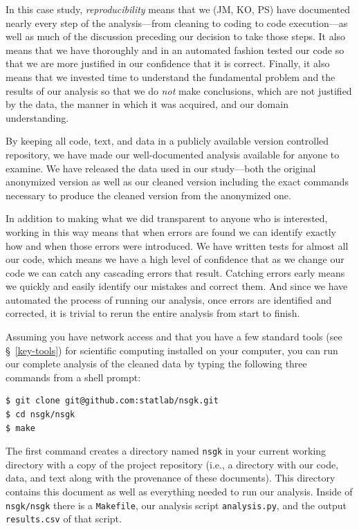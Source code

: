 \documentclass[]{article}
\begin{document}
In this case study, \emph{reproducibility} means that we (JM, KO, PS) have
documented nearly every step of the analysis---from cleaning to coding to
code execution---as well as much of the discussion preceding our decision
to take those steps.
It also means that we have thoroughly and in an automated fashion tested
our code so that we are more justified in our confidence that it is
correct.
Finally, it also means that we invested time to understand the fundamental
problem and the results of our analysis so that we do \emph{not} make
conclusions, which are not justified by the data, the manner in which it was
acquired, and our domain understanding.

By keeping all code, text, and data in a publicly available version
controlled repository, we have made our well-documented analysis available
for anyone to examine.
We have released the data used in our study---both the original anonymized
version as well as our cleaned version including the exact commands necessary
to produce the cleaned version from the anonymized one.

In addition to making what we did transparent to anyone who is interested,
working in this way means that when errors are found we can identify
exactly how and when those errors were introduced.
We have written tests for almost all our code, which means we have a high
level of confidence that as we change our code we can catch any cascading
errors that result.
Catching errors early means we quickly and easily identify our mistakes and
correct them.
And since we have automated the process of running our analysis, once errors
are identified and corrected, it is trivial to rerun the entire analysis from
start to finish.

Assuming you have network access and that you have a few standard tools (see
\S~\ref{key-tools}) for scientific computing installed on your computer, you
can run our complete analysis of the cleaned data by typing the following three
commands from a shell prompt:
\begin{verbatim}
$ git clone git@github.com:statlab/nsgk.git
$ cd nsgk/nsgk
$ make
\end{verbatim}
The first command creates a directory named \texttt{nsgk} in your current
working directory with a copy of the project repository (i.e., a directory with
our code, data, and text along with the provenance of these documents).
This directory contains this document as well as everything needed to run our
analysis.
Inside of \texttt{nsgk/nsgk} there is a \texttt{Makefile}, our analysis script
\texttt{analysis.py}, and the output \texttt{results.csv} of that script.
\end{document}
